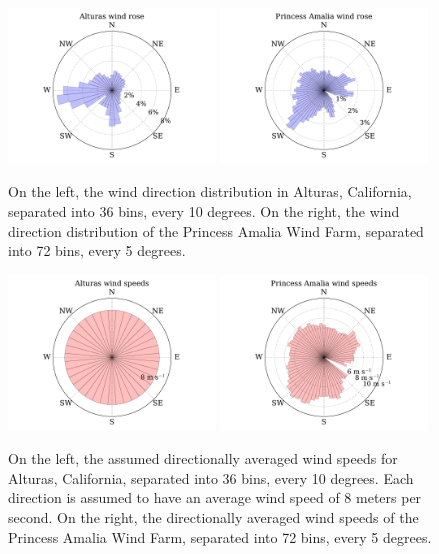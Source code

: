 \documentclass[wes, manuscript]{copernicus}
\begin{document}
\begin{figure}[htbp]
  \centering
  \includegraphics[width=0.49\textwidth]{Figures/alturas_rose.pdf}
  \includegraphics[width=0.49\textwidth]{Figures/amalia_rose.pdf}
  \caption{\label{wind_roses} On the left, the wind direction distribution in Alturas, California, separated into 36 bins, every 10 degrees. On the right, the wind direction distribution of the Princess Amalia Wind Farm, separated into 72 bins, every 5 degrees.}
\end{figure}

\begin{figure}[htbp]
  \centering
  \includegraphics[width=0.49\textwidth]{Figures/alturas_speeds.pdf}
  \includegraphics[width=0.49\textwidth]{Figures/amalia_speeds.pdf}
  \caption{\label{wind_speeds} On the left, the assumed directionally averaged wind speeds for Alturas, California, separated into 36 bins, every 10 degrees. Each direction is assumed to have an average wind speed of 8 meters per second. On the right, the directionally averaged wind speeds of the Princess Amalia Wind Farm, separated into 72 bins, every 5 degrees.}
\end{figure}
\end{document}
